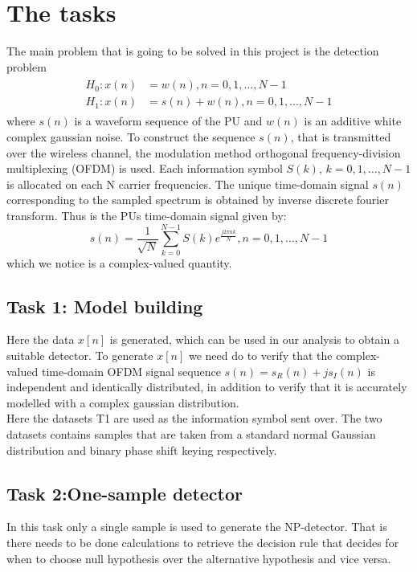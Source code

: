 \section{The tasks}\label{sec:task}
The main problem that is going to be solved in this project is the detection problem
\begin{align}
\begin{split}
	H_0: x(n) & = w(n), n = 0, 1, \dots, N-1\\
	H_1: x(n) & = s(n) + w(n), n = 0, 1, \dots, N-1
\end{split}
\end{align}\label{eq:detection_problem}
where $s(n)$ is a waveform sequence of the PU and $w(n)$ is an additive white complex gaussian noise.
To construct the sequence $s(n)$, that is transmitted over the wireless channel, the modulation method orthogonal frequency-division multiplexing (OFDM) is used. Each information symbol $S(k)$, $k=0,1,\dots,N-1$ is allocated on each N carrier frequencies. The unique time-domain signal $s(n)$ corresponding to the sampled spectrum is obtained by inverse discrete fourier transform. Thus is the PUs time-domain signal given by:
\begin{equation}
	s(n) = \frac{1}{\sqrt{N}}\sum_{k=0}^{N-1}S(k)e^{\frac{j2\pi nk}{N}}, n = 0,1,\dots,N-1
\end{equation}
which we notice is a complex-valued quantity.
\subsection{Task 1: Model building}
Here the data $x[n]$ is generated, which can be used in our analysis to obtain a suitable detector. To generate $x[n]$ we need do to verify that the complex-valued time-domain OFDM signal sequence $s(n) = s_R(n)+js_I(n)$ is independent and identically distributed, in addition to verify that it is accurately modelled with a complex gaussian distribution.\\
Here the datasets T1 are used as the information symbol sent over. The two datasets contains samples that are taken from a standard normal Gaussian distribution and binary phase shift keying respectively.
\subsection{Task 2:One-sample detector}
In this task only a single sample is used to generate the NP-detector. That is there needs to be done calculations to retrieve the decision rule that decides for when to choose null hypothesis over the alternative hypothesis and vice versa.
